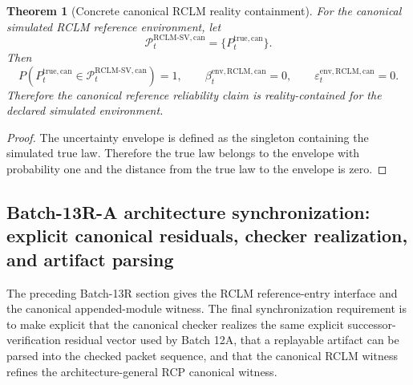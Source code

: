 \documentclass[11pt,a4paper]{article}
\newtheorem{theorem}{Theorem}[section]
\newcommand{\Pcal}{\mathcal P}
\newcommand{\RCLM}{\mathrm{RCLM}}
\newcommand{\true}{\mathrm{true}}
\begin{document}
\begin{theorem}[Concrete canonical RCLM reality containment]
\label{thm:rclm-batch13r-canonical-reality-containment}
For the canonical simulated RCLM reference environment, let
\[
\Pcal_t^{\RCLM\text{-}\mathrm{SV},\mathrm{can}}
=
\{P_t^{\true,\mathrm{can}}\}.
\]
Then
\[
P(P_t^{\true,\mathrm{can}}\in\Pcal_t^{\RCLM\text{-}\mathrm{SV},\mathrm{can}})=1,
\qquad
\beta_t^{\mathrm{env},\RCLM,\mathrm{can}}=0,
\qquad
\varepsilon_t^{\mathrm{env},\RCLM,\mathrm{can}}=0.
\]
Therefore the canonical reference reliability claim is reality-contained for the declared simulated environment.
\end{theorem}

\begin{proof}
The uncertainty envelope is defined as the singleton containing the simulated true law.  Therefore the true law belongs to the envelope with probability one and the distance from the true law to the envelope is zero.
\end{proof}



\subsection{Batch-13R-A architecture synchronization: explicit canonical residuals, checker realization, and artifact parsing}
\label{subsec:rclm-batch13rA-explicit-canonical-sync}

The preceding Batch-13R section gives the RCLM reference-entry interface and the canonical appended-module witness.  The final synchronization requirement is to make explicit that the canonical checker realizes the same explicit successor-verification residual vector used by Batch 12A, that a replayable artifact can be parsed into the checked packet sequence, and that the canonical RCLM witness refines the architecture-general RCP canonical witness.
\end{document}
